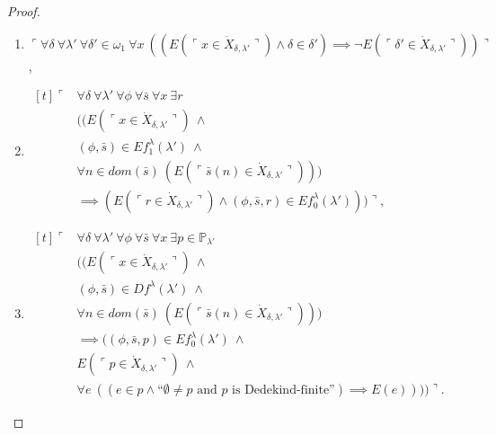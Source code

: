 \documentclass[12pt]{article}
\numberwithin{equation}{section}
\begin{document}
\begin{proof}
\begin{defi}
\begin{enumerate}[label=(S\arabic*)$_{\lambda}$, leftmargin=40pt]
    \item\label{c6} $\ulcorner \forall \delta \ \forall \lambda' \ \forall \delta' \in \omega_1 \ \forall x \ ((E(\ulcorner x \in \dot{X}_{\delta, \lambda'} \urcorner) \wedge \delta \in \delta') \implies \neg E(\ulcorner \delta' \in \dot{X}_{\delta, \lambda'} \urcorner)) \urcorner$, 
    
    \item\label{c7} 
    \!
    $\begin{aligned}[t]
        \ulcorner & \forall \delta \ \forall \lambda' \ \forall \phi \ \forall \bar{s} \ \forall x \ \exists r \\
        & ((E(\ulcorner x \in \dot{X}_{\delta, \lambda'} \urcorner) \ \wedge \ \\
        & (\phi, \bar{s}) \in Ef_1^{\lambda}(\lambda') \ \wedge \\
        & \forall n \in dom(\bar{s}) \ (E(\ulcorner \bar{s}(n) \in \dot{X}_{\delta, \lambda'} \urcorner))) \\
        & \implies (E(\ulcorner r \in \dot{X}_{\delta, \lambda'} \urcorner) \wedge (\phi, \bar{s}, r) \in Ef_0^{\lambda}(\lambda'))) \urcorner,
    \end{aligned}$
    
    \item\label{c8}
    \!
    $\begin{aligned}[t]
        \ulcorner & \forall \delta \ \forall \lambda' \ \forall \phi \ \forall \bar{s} \ \forall x \ \exists p \in \mathbb{P}_{\lambda'} \\
        & ((E(\ulcorner x \in \dot{X}_{\delta, \lambda'} \urcorner) \ \wedge \\
        & (\phi, \bar{s}) \in Df^{\lambda}(\lambda') \ \wedge \\
        & \forall n \in dom(\bar{s}) \ (E(\ulcorner \bar{s}(n) \in \dot{X}_{\delta, \lambda'} \urcorner))) \\
        & \implies ((\phi, \bar{s}, p) \in Ef_0^{\lambda}(\lambda') \ \wedge \\
        & E(\ulcorner p \in \dot{X}_{\delta, \lambda'} \urcorner) \ \wedge \\
        & \forall e \ ((e \in p \wedge \text{``}\emptyset \neq p \text{ and } p \text{ is Dedekind-finite''}) \implies E(e)))) \urcorner.
    \end{aligned}$
\end{enumerate}
\end{defi}


\end{proof}
\end{document}
